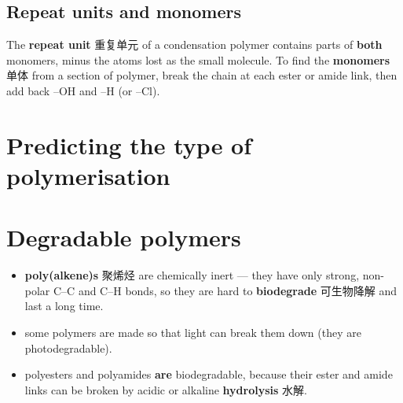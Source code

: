 \documentclass[11pt]{article}
\begin{document}
\subsection*{Repeat units and monomers}

The \textbf{repeat unit} 重复单元 of a condensation polymer contains parts of \textbf{both} monomers, minus the atoms lost as the small molecule. To find the \textbf{monomers} 单体 from a section of polymer, break the chain at each ester or amide link, then add back $\text{–OH}$ and $\text{–H}$ (or $\text{–Cl}$).

\section*{Predicting the type of polymerisation}

\begin{center}
\end{center}

\section*{Degradable polymers}

\begin{itemize}
\item \textbf{poly(alkene)s} 聚烯烃 are chemically inert — they have only strong, non-polar C–C and C–H bonds, so they are hard to \textbf{biodegrade} 可生物降解 and last a long time.

\item some polymers are made so that light can break them down (they are photodegradable).

\item polyesters and polyamides \textbf{are} biodegradable, because their ester and amide links can be broken by acidic or alkaline \textbf{hydrolysis} 水解.

\end{itemize}
\end{document}
